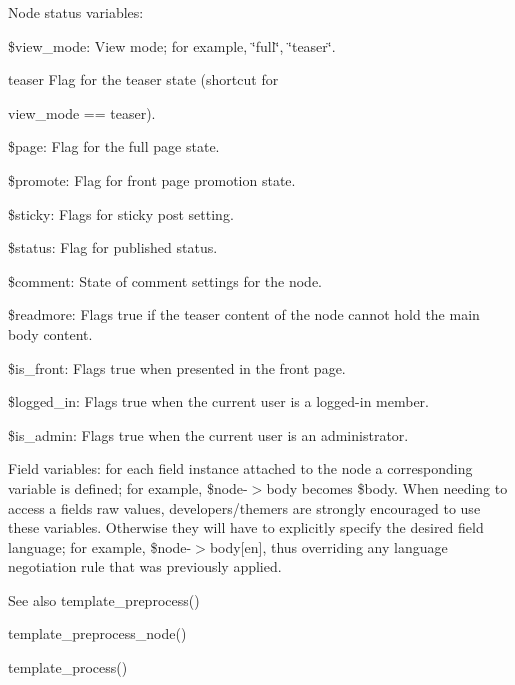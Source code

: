 Node status variables\+:
\begin{DoxyItemize}
\item \$view\+\_\+mode\+: View mode; for example, \char`\"{}full\char`\"{}, \char`\"{}teaser\char`\"{}.
\item \begin{DoxyParagraph}{teaser}
Flag for the teaser state (shortcut for 
\end{DoxyParagraph}
view\+\_\+mode == \textquotesingle{}teaser\textquotesingle{}).
\item \$page\+: Flag for the full page state.
\item \$promote\+: Flag for front page promotion state.
\item \$sticky\+: Flags for sticky post setting.
\item \$status\+: Flag for published status.
\item \$comment\+: State of comment settings for the node.
\item \$readmore\+: Flags true if the teaser content of the node cannot hold the main body content.
\item \$is\+\_\+front\+: Flags true when presented in the front page.
\item \$logged\+\_\+in\+: Flags true when the current user is a logged-\/in member.
\item \$is\+\_\+admin\+: Flags true when the current user is an administrator.
\end{DoxyItemize}

Field variables\+: for each field instance attached to the node a corresponding variable is defined; for example, \$node-\/$>$body becomes \$body. When needing to access a field\textquotesingle{}s raw values, developers/themers are strongly encouraged to use these variables. Otherwise they will have to explicitly specify the desired field language; for example, \$node-\/$>$body\mbox{[}\textquotesingle{}en\textquotesingle{}\mbox{]}, thus overriding any language negotiation rule that was previously applied.

\begin{DoxySeeAlso}{See also}
template\+\_\+preprocess() 

template\+\_\+preprocess\+\_\+node() 

template\+\_\+process() 
\end{DoxySeeAlso}
